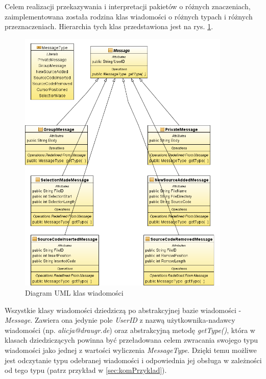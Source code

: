 \documentclass[polish,11pt,a4paper,twoside]{article}
\begin{document}
Celem realizacji przekazywania i interpretacji pakietów o różnych znaczeniach, zaimplementowana została rodzina klas wiadomości o różnych typach i różnych przeznaczeniach. Hierarchia tych klas przedstawiona jest na rys. \ref{fig:uml_class_message}.
\begin{figure}[!htb]
  \begin{center}
    \includegraphics[width=0.9\textwidth]{img/uml_class_message.png}
    \caption{Diagram UML klas wiadomości} \label{fig:uml_class_message} 
  \end{center}
\end{figure}

Wszystkie klasy wiadomości dziedziczą po abstrakcyjnej bazie wiadomości - \emph{Message}. Zawiera ona jedynie pole \emph{UserID} z nazwą użytkownika-nadawcy wiadomości (np. \emph{alicja@draugr.de}) oraz abstrakcyjną metodę \emph{getType()}, która w klasach dziedziczących powinna być przeładowana celem zwracania swojego typu wiadomości jako jednej z wartości wyliczenia \emph{MessageType}. Dzięki temu możliwe jest odczytanie typu odebranej wiadomości i odpowiednia jej obsługa w zależności od tego typu (patrz przykład w \ref{sec:komPrzyklad}).
\end{document}
